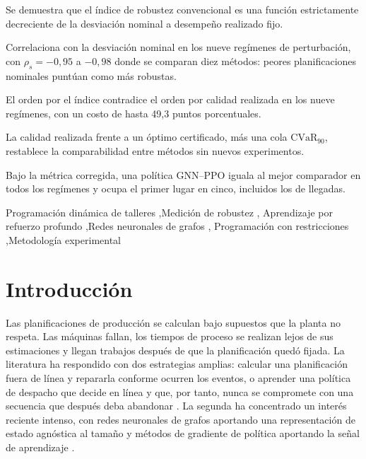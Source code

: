 \documentclass[a4paper,fleqn]{cas-sc}
\newcommand{\CVaR}{\mathrm{CVaR}}
\begin{document}
\begin{highlights}
\item Se demuestra que el índice de robustez convencional es una función
estrictamente decreciente de la desviación nominal a desempeño realizado fijo.
\item Correlaciona con la desviación nominal en los nueve regímenes de
perturbación, con $\rho_s=-0{,}95$ a $-0{,}98$ donde se comparan diez métodos:
peores planificaciones nominales puntúan como más robustas.
\item El orden por el índice contradice el orden por calidad realizada en los
nueve regímenes, con un costo de hasta 49,3 puntos porcentuales.
\item La calidad realizada frente a un óptimo certificado, más una cola
$\CVaR_{90}$, restablece la comparabilidad entre métodos sin nuevos
experimentos.
\item Bajo la métrica corregida, una política GNN--PPO iguala al mejor
comparador en todos los regímenes y ocupa el primer lugar en cinco, incluidos
los de llegadas.
\end{highlights}

\begin{keywords}
Programación dinámica de talleres \sep Medición de robustez \sep
Aprendizaje por refuerzo profundo \sep Redes neuronales de grafos \sep
Programación con restricciones \sep Metodología experimental
\end{keywords}

\maketitle

\section{Introducción}\label{sec:intro}

Las planificaciones de producción se calculan bajo supuestos que la planta no
respeta. Las máquinas fallan, los tiempos de proceso se realizan lejos de sus
estimaciones y llegan trabajos después de que la planificación quedó fijada. La
literatura ha respondido con dos estrategias amplias: calcular una planificación
fuera de línea y repararla conforme ocurren los eventos, o aprender una política
de despacho que decide en línea y que, por tanto, nunca se compromete con una
secuencia que después deba abandonar \citep{ouelhadj2009,aytug2005}. La segunda
ha concentrado un interés reciente intenso, con redes neuronales de grafos
aportando una representación de estado agnóstica al tamaño y métodos de
gradiente de política aportando la señal de aprendizaje
\citep{zhang2020,park2021,song2023,bengio2021}.
\end{document}
